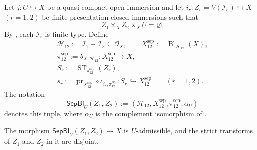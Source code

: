\begin{definition}
  \label{def:nagata-separate-closed-subschemes}

  Let $j\colon U\hookrightarrow X$ be a quasi-compact open immersion and let
  $i_r\colon Z_r=V(\mathcal I_r)\hookrightarrow X$ $(r=1,2)$ be
  finite-presentation closed immersions such that
  \[
    Z_1\times_XZ_2\times_XU=\varnothing.
  \]
  By , each $\mathcal I_r$ is
  finite-type.  Define
  \[
  \begin{gathered}
    \mathcal H_{12}:=\mathcal I_1+\mathcal I_2
      \subseteq\mathcal O_X,\qquad
    X^{\mathrm{sep}}_{12}:=
      \operatorname{Bl}_{\mathcal H_{12}}(X),\\
    \pi_{12}^{\mathrm{sep}}:=b_{X,\mathcal H_{12}}
      \colon X^{\mathrm{sep}}_{12}\to X,\\
    S_r:=\operatorname{ST}_{\pi_{12}^{\mathrm{sep}}}(Z_r),\\
    s_r:=\operatorname{pr}_{X^{\mathrm{sep}}_{12}}\circ
      \iota_{i_r,\pi_{12}^{\mathrm{sep}}}
      \colon S_r\hookrightarrow X^{\mathrm{sep}}_{12}
      \qquad(r=1,2).
  \end{gathered}
  \]
  The notation
  \[
    \mathsf{SepBl}_U(Z_1,Z_2)
      :=(\mathcal H_{12},X^{\mathrm{sep}}_{12},
          \pi_{12}^{\mathrm{sep}},\alpha_U)
  \]
  denotes this tuple, where $\alpha_U$ is the complement isomorphism of
  .
\end{definition}

\begin{lemma}
  \label{lemma:nagata-separate-closed-subschemes}

  The morphism $\mathsf{SepBl}_U(Z_1,Z_2)\to X$ is $U$-admissible, and the
  strict transforms of $Z_1$ and $Z_2$ in it are disjoint.
\end{lemma}

